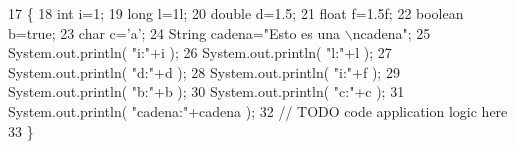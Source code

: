 \begin{DoxyCode}
17                                            \{
18         \textcolor{keywordtype}{int} i=1;
19             \textcolor{keywordtype}{long} l=1l;
20             \textcolor{keywordtype}{double} d=1.5;
21             \textcolor{keywordtype}{float} f=1.5f;
22             \textcolor{keywordtype}{boolean} b=\textcolor{keyword}{true};
23             \textcolor{keywordtype}{char} c=\textcolor{charliteral}{'a'};
24             String cadena=\textcolor{stringliteral}{"Esto es una \(\backslash\)ncadena"};
25             System.out.println( \textcolor{stringliteral}{"i:"}+i );
26             System.out.println( \textcolor{stringliteral}{"l:"}+l );
27             System.out.println( \textcolor{stringliteral}{"d:"}+d );
28             System.out.println( \textcolor{stringliteral}{"i:"}+f );
29             System.out.println( \textcolor{stringliteral}{"b:"}+b );
30             System.out.println( \textcolor{stringliteral}{"c:"}+c );
31             System.out.println( \textcolor{stringliteral}{"cadena:"}+cadena );
32         \textcolor{comment}{// TODO code application logic here}
33     \}
\end{DoxyCode}
